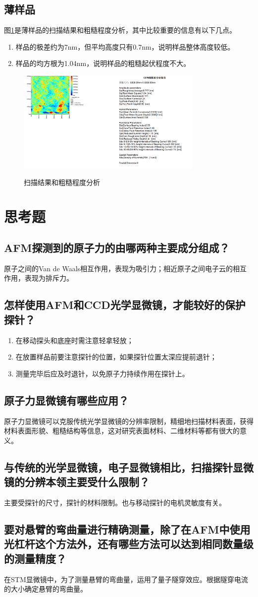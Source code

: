 \documentclass[a4paper]{article}
\begin{document}
\subsection{薄样品}
图\ref{fig9}是薄样品的扫描结果和粗糙程度分析，其中比较重要的信息有以下几点。
\begin{enumerate}
	\item 样品的极差约为7nm，但平均高度只有0.7nm，说明样品整体高度较低。
	\item 样品的均方根为1.04nm，说明样品的粗糙起伏程度不大。
\end{enumerate}
\begin{figure}[htbp]
\centering
\includegraphics[width=0.8\textwidth]{data/1/hengxl001_ROU.png}\\
\caption{扫描结果和粗糙程度分析}\label{fig9}
\end{figure}

\section{思考题}
\subsection*{AFM探测到的原子力的由哪两种主要成分组成？}
原子之间的Van de Waals相互作用，表现为吸引力；相近原子之间电子云的相互作用，表现为排斥力。
\subsection*{怎样使用AFM和CCD光学显微镜，才能较好的保护探针？}
\begin{enumerate}
	\item 在移动探头和底座时需注意轻拿轻放；
	\item 在放置样品前要注意探针的位置，如果探针位置太深应提前退针；
	\item 测量完毕后应及时退针，以免原子力持续作用在探针上。
\end{enumerate}
\subsection*{原子力显微镜有哪些应用？}
原子力显微镜可以克服传统光学显微镜的分辨率限制，精细地扫描材料表面，获得材料表面形貌、粗糙结构等信息，这对研究表面材料、二维材料等都有很大的意义。
\subsection*{与传统的光学显微镜，电子显微镜相比，扫描探针显微镜的分辨本领主要受什么限制？}
主要受探针的尺寸，探针的材料限制。也与移动探针的电机灵敏度有关。
\subsection*{要对悬臂的弯曲量进行精确测量，除了在AFM中使用光杠杆这个方法外，还有哪些方法可以达到相同数量级的测量精度？}
在STM显微镜中，为了测量悬臂的弯曲量，运用了量子隧穿效应。根据隧穿电流的大小确定悬臂的弯曲量。

\nocite{jiaocai}

\end{document}
